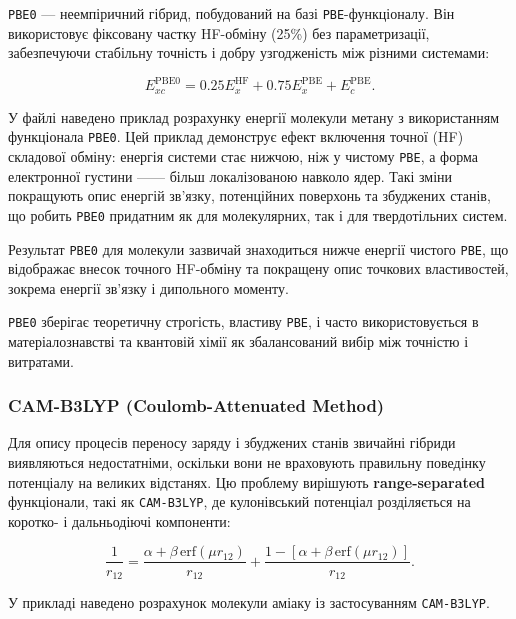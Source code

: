\texttt{PBE0} --- неемпіричний гібрид, побудований на базі \texttt{PBE}-функціоналу.
Він використовує фіксовану частку HF-обміну (25\%) без параметризації, забезпечуючи стабільну точність і добру узгодженість між різними системами:

\begin{equation}
E_{xc}^{\text{PBE0}} = 0.25E_x^{\text{HF}} + 0.75E_x^{\text{PBE}} + E_c^{\text{PBE}}.
\end{equation}

У файлі  наведено приклад розрахунку енергії молекули метану
з використанням функціонала \texttt{PBE0}.
Цей приклад демонструє ефект включення точної (HF) складової обміну: енергія системи
стає нижчою, ніж у чистому \texttt{PBE}, а форма електронної густини ---— більш локалізованою навколо ядер.
Такі зміни покращують опис енергій зв’язку, потенційних поверхонь та збуджених станів,
що робить \texttt{PBE0} придатним як для молекулярних, так і для твердотільних систем.

Результат \texttt{PBE0} для молекули  зазвичай знаходиться нижче енергії чистого \texttt{PBE},
що відображає внесок точного HF-обміну та покращену опис точкових властивостей, зокрема енергії зв’язку і дипольного моменту.

\texttt{PBE0} зберігає теоретичну строгість, властиву \texttt{PBE}, і часто використовується
в матеріалознавстві та квантовій хімії як збалансований вибір між точністю і витратами.

\subsubsection{CAM-B3LYP (Coulomb-Attenuated Method)}

Для опису процесів переносу заряду і збуджених станів звичайні гібриди виявляються недостатніми, оскільки вони не враховують правильну поведінку потенціалу на великих відстанях.
Цю проблему вирішують \textbf{range-separated} функціонали, такі як \texttt{CAM-B3LYP}, де кулонівський потенціал розділяється на коротко- і дальньодіючі компоненти:

\begin{equation}
\frac{1}{r_{12}} =
\frac{\alpha + \beta \,\mathrm{erf}(\mu r_{12})}{r_{12}} +
\frac{1 - [\alpha + \beta \,\mathrm{erf}(\mu r_{12})]}{r_{12}}.
\end{equation}

У прикладі  наведено розрахунок молекули аміаку із застосуванням \texttt{CAM-B3LYP}.


